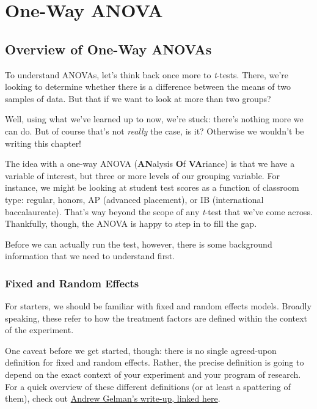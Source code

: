 
\chapter{One-Way ANOVA}

\section{Overview of One-Way ANOVAs}

To understand ANOVAs, let's think back once more to \textit{t}-tests. There, we're looking to determine whether there is a difference between the means of two samples of data. But that if we want to look at more than two groups? 

Well, using what we've learned up to now, we're stuck: there's nothing more we can do. But of course that's not \textit{really} the case, is it? Otherwise we wouldn't be writing this chapter!

The idea with a one-way ANOVA (\textbf{AN}alysis \textbf{O}f \textbf{VA}riance) is that we have a variable of interest, but three or more levels of our grouping variable. For instance, we might be looking at student test scores as a function of classroom type: regular, honors, AP (advanced placement), or IB (international baccalaureate). That's way beyond the scope of any \textit{t}-test that we've come across. Thankfully, though, the ANOVA is happy to step in to fill the gap.

Before we can actually run the test, however, there is some background information that we need to understand first.

\subsection{Fixed and Random Effects}

For starters, we should be familiar with fixed and random effects models. Broadly speaking, these refer to how the treatment factors are defined within the context of the experiment.

One caveat before we get started, though: there is no single agreed-upon definition for fixed and random effects. Rather, the precise definition is going to depend on the exact context of your experiment and your program of research. For a quick overview of these different definitions (or at least a spattering of them), check out \href{http://andrewgelman.com/2005/01/25/why_i_dont_use/}{Andrew Gelman's write-up, linked here}.

